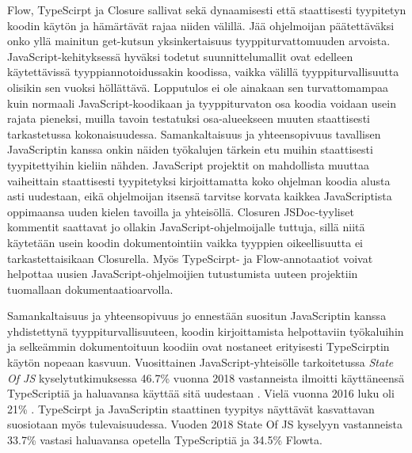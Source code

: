 Flow, TypeScirpt ja Closure sallivat sekä dynaamisesti että
staattisesti tyypitetyn koodin käytön ja hämärtävät rajaa niiden välillä.
Jää ohjelmoijan päätettäväksi onko yllä mainitun get-kutsun yksinkertaisuus
tyyppiturvattomuuden arvoista. JavaScript-kehityksessä hyväksi todetut
suunnittelumallit ovat edelleen käytettävissä tyyppiannotoidussakin
koodissa, vaikka välillä tyyppiturvallisuutta olisikin sen vuoksi höllättävä.
Lopputulos ei ole ainakaan sen turvattomampaa kuin normaali JavaScript-koodikaan
ja tyyppiturvaton osa koodia voidaan usein rajata pieneksi, muilla tavoin
testatuksi osa-alueekseen muuten staattisesti tarkastetussa kokonaisuudessa.
Samankaltaisuus ja yhteensopivuus tavallisen JavaScriptin kanssa onkin
näiden työkalujen tärkein etu muihin staattisesti tyypitettyihin kieliin
nähden. JavaScript projektit on mahdollista muuttaa vaiheittain staattisesti
tyypitetyksi kirjoittamatta koko ohjelman koodia alusta asti uudestaan, eikä
ohjelmoijan itsensä tarvitse korvata kaikkea JavaScriptista oppimaansa
uuden kielen tavoilla ja yhteisöllä. Closuren JSDoc-tyyliset kommentit
saattavat jo ollakin JavaScript-ohjelmoijalle tuttuja, sillä niitä käytetään
usein koodin dokumentointiin vaikka tyyppien oikeellisuutta ei
tarkastettaisikaan Closurella. Myös TypeScirpt- ja Flow-annotaatiot voivat
helpottaa uusien JavaScript-ohjelmoijien tutustumista uuteen projektiin
tuomallaan dokumentaatioarvolla.

Samankaltaisuus ja yhteensopivuus jo ennestään suositun JavaScriptin kanssa
yhdistettynä tyyppiturvallisuuteen, koodin kirjoittamista helpottaviin
työkaluihin ja selkeämmin dokumentoituun koodiin ovat nostaneet erityisesti
TypeScirptin käytön nopeaan kasvuun. Vuosittainen JavaScript-yhteisölle
tarkoitetussa \textit{State Of JS} kyselytutkimuksessa 46.7\% vuonna 2018
vastanneista ilmoitti käyttäneensä TypeScriptiä ja haluavansa
käyttää sitä uudestaan \cite{StateOfJs2018}.
Vielä vuonna 2016 luku oli 21\% \cite{StateOfJs2016}. TypeScirpt
ja JavaScriptin staattinen tyypitys näyttävät kasvattavan suosiotaan myös
tulevaisuudessa. Vuoden 2018 State Of JS kyselyyn vastanneista 33.7\%
vastasi haluavansa opetella TypeScriptiä ja 34.5\% Flowta.
